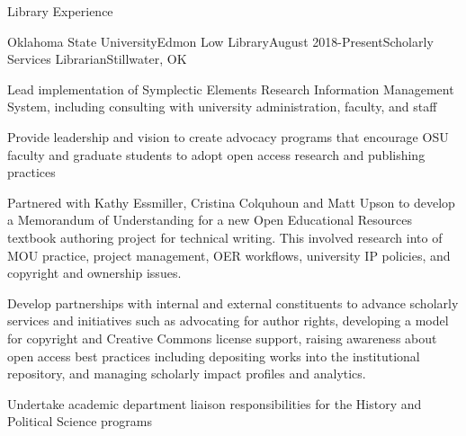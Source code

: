 \documentclass{resume} %
\begin{document}
\begin{rSection}{Library Experience}
\raggedright

\begin{rSubsection}{Oklahoma State University}{Edmon Low Library}{August 2018-Present}{Scholarly Services Librarian}{Stillwater, OK}
\item Lead implementation of Symplectic Elements Research Information Management System, including consulting with university administration, faculty, and staff
\item Provide leadership and vision to create advocacy programs that encourage OSU faculty and graduate students to adopt open access research and publishing practices
\item Partnered with Kathy Essmiller, Cristina Colquhoun and Matt Upson to develop a Memorandum of Understanding for a new Open Educational Resources textbook authoring project for technical writing. This involved research into of MOU practice, project management, OER workflows, university IP policies, and copyright and ownership issues.  
\item Develop partnerships with internal and external constituents to advance scholarly services and initiatives such as advocating for author rights, developing a model for copyright and Creative Commons license support, raising awareness about open access best practices including depositing works into the institutional repository, and managing scholarly impact profiles and analytics.
\item Undertake academic department liaison responsibilities for the History and Political Science programs
\end{rSubsection}


\end{rSection}
\end{document}
